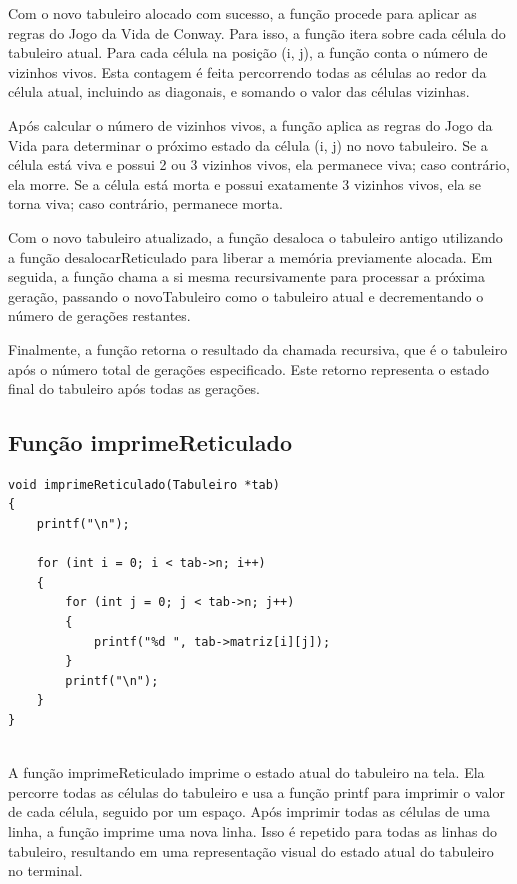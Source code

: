 \documentclass{article}
\begin{document}
\par Com o novo tabuleiro alocado com sucesso, a função procede para aplicar as regras do Jogo da Vida de Conway. Para isso, a função itera sobre cada célula do tabuleiro atual. Para cada célula na posição (i, j), a função conta o número de vizinhos vivos. Esta contagem é feita percorrendo todas as células ao redor da célula atual, incluindo as diagonais, e somando o valor das células vizinhas.

\par Após calcular o número de vizinhos vivos, a função aplica as regras do Jogo da Vida para determinar o próximo estado da célula (i, j) no novo tabuleiro. Se a célula está viva e possui 2 ou 3 vizinhos vivos, ela permanece viva; caso contrário, ela morre. Se a célula está morta e possui exatamente 3 vizinhos vivos, ela se torna viva; caso contrário, permanece morta.

\par Com o novo tabuleiro atualizado, a função desaloca o tabuleiro antigo utilizando a função desalocarReticulado para liberar a memória previamente alocada. Em seguida, a função chama a si mesma recursivamente para processar a próxima geração, passando o novoTabuleiro como o tabuleiro atual e decrementando o número de gerações restantes.

\par Finalmente, a função retorna o resultado da chamada recursiva, que é o tabuleiro após o número total de gerações especificado. Este retorno representa o estado final do tabuleiro após todas as gerações.

\subsection{Função imprimeReticulado}

\begin{lstlisting}[caption={},label={lst:cod1},language={[x86masm]Assembler}]
void imprimeReticulado(Tabuleiro *tab)
{
    printf("\n");

    for (int i = 0; i < tab->n; i++)
    {
        for (int j = 0; j < tab->n; j++)
        {
            printf("%d ", tab->matriz[i][j]);
        }
        printf("\n");
    }
}


\end{lstlisting}

\par A função imprimeReticulado imprime o estado atual do tabuleiro na tela. Ela percorre todas as células do tabuleiro e usa a função printf para imprimir o valor de cada célula, seguido por um espaço. Após imprimir todas as células de uma linha, a função imprime uma nova linha. Isso é repetido para todas as linhas do tabuleiro, resultando em uma representação visual do estado atual do tabuleiro no terminal.
\end{document}
